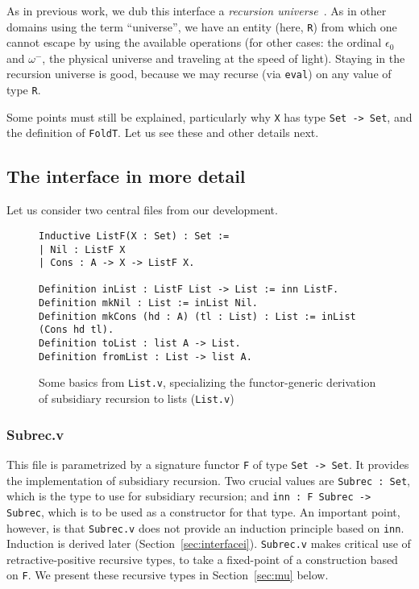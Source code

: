 \documentclass[a4paper,USenglish]{lipics-v2021}
\begin{document}
As in previous work, we dub this interface a \emph{recursion
universe}~\cite{stump20}.  As in other domains using the term
``universe'', we have an entity (here, \verb|R|) from which one cannot
escape by using the available operations (for other cases:
the ordinal $\epsilon_0$ and $\omega^-$, the physical universe and traveling at
the speed of light).  Staying in the recursion universe is good,
because we may recurse (via \verb|eval|) on any value of type
\verb|R|.

Some points must still be explained, particularly why \verb|X| has type \verb|Set -> Set|,
and the definition of \verb|FoldT|.  Let us see these and other details next.

\subsection{The interface in more detail}

Let us consider two central files from our development.

\begin{figure}
  \begin{verbatim}
Inductive ListF(X : Set) : Set :=
| Nil : ListF X
| Cons : A -> X -> ListF X.

Definition inList : ListF List -> List := inn ListF.
Definition mkNil : List := inList Nil.
Definition mkCons (hd : A) (tl : List) : List := inList (Cons hd tl).
Definition toList : list A -> List.
Definition fromList : List -> list A.
\end{verbatim}
  \caption{Some basics from \texttt{List.v}, specializing the functor-generic derivation of subsidiary recursion to lists (\texttt{List.v})}
  \label{fig:listf}
\end{figure}

\subsubsection{Subrec.v}

  This file is parametrized by a signature functor \verb|F| of type
  \verb|Set -> Set|.  It provides the implementation of subsidiary
  recursion.  Two crucial values are \verb|Subrec : Set|, which is the
  type to use for subsidiary recursion; and
  \verb|inn : F Subrec -> Subrec|, which is to be used as a
  constructor for that type.  An important point, however, is that
  \verb|Subrec.v| does not provide an induction principle based on
  \verb|inn|.  Induction is derived later
  (Section~\ref{sec:interfacei}). \verb|Subrec.v| makes critical use
  of retractive-positive recursive types, to take a fixed-point of a
  construction based on \verb|F|.  We present these recursive
  types in Section~\ref{sec:mu} below.
\end{document}
